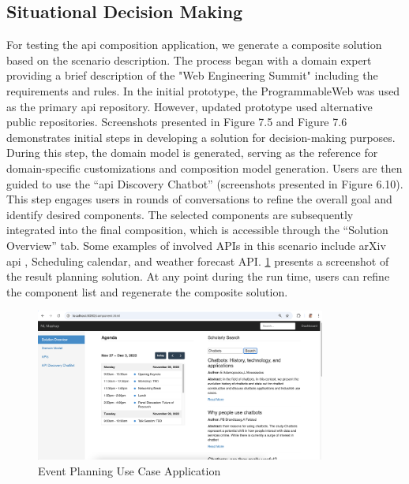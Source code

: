 \vspace{-15pt}
\hypertarget{sec:evaluation.scenario-sdm}{%
\subsection{Situational Decision Making}\label{sec:evaluation.scenario-sdm}}
\vspace{15pt}

For testing the \gls{api} composition application, we generate a composite solution based on the scenario description. The process began with a domain expert providing a brief description of the "Web Engineering Summit" including the requirements and rules. In the initial prototype, the ProgrammableWeb was used as the primary \gls{api} repository. However, updated prototype used alternative public repositories.  
Screenshots presented in Figure 7.5 and Figure 7.6 demonstrates initial steps in developing a solution for decision-making purposes. During this step, the domain model is generated, serving as the reference for domain-specific customizations and composition model generation. Users are then guided to use the “\gls{api} Discovery Chatbot” (screenshots presented in  Figure 6.10). This step engages users in rounds of conversations to refine the overall goal and identify desired components. The selected components are subsequently integrated into the final composition, which is accessible through the “Solution Overview” tab. Some examples of involved APIs in this scenario include arXiv \gls{api} , Scheduling calendar, and weather forecast API. \cref{fig:eval-planning} presents a screenshot of the result planning solution. At any point during the run time, users can refine the component list and regenerate the composite solution. 

\begin{figure}[hbt]
\hypertarget{fig:eval-planning}{%
\centering
\includegraphics[width=0.85\textwidth]{../figures/MyFigures/event-planner.png}
\captionsetup{justification=centering}
\caption{Event Planning Use Case Application}\label{fig:eval-planning}
}
\end{figure}

